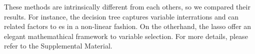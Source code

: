 These methods are intrinsically different from each others, so we compared their results. For instance, the decision
tree captures variable interrations and can related factors to \gls{es} in a non-linear fashion. On the otherhand, the
\gls{lasso} offer an elegant mathemathical framework to variable selection. For more details, please refer to the Supplemental Material.















